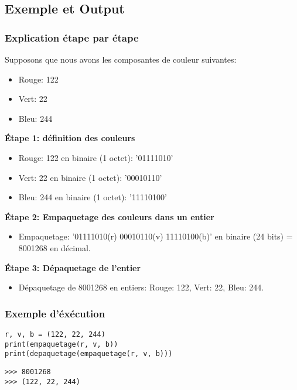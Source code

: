 \documentclass{article}
\begin{document}
\subsection*{Exemple et Output}
\subsubsection*{Explication étape par étape}
Supposons que nous avons les composantes de couleur suivantes:
\begin{itemize}
  \item Rouge: 122
  \item Vert: 22
  \item Bleu: 244
\end{itemize}

\textbf{Étape 1: définition des couleurs}
\begin{itemize}
  \item Rouge: 122 en binaire (1 octet): '01111010'
  \item Vert: 22 en binaire (1 octet): '00010110'
  \item Bleu: 244 en binaire (1 octet): '11110100'
\end{itemize}

\textbf{Étape 2: Empaquetage des couleurs dans un entier}
\begin{itemize}
  \item Empaquetage: '01111010(r) 00010110(v) 11110100(b)' en binaire (24 bits) = 8001268 en décimal.
\end{itemize}

\textbf{Étape 3: Dépaquetage de l'entier}
\begin{itemize}
  \item Dépaquetage de 8001268 en entiers: Rouge: 122, Vert: 22, Bleu: 244.
\end{itemize}

\subsubsection*{Exemple d'éxécution}
\begin{lstlisting}[caption=Exemple d'éxécution]
r, v, b = (122, 22, 244)
print(empaquetage(r, v, b))
print(depaquetage(empaquetage(r, v, b)))
\end{lstlisting}

\begin{lstlisting}[caption=Output]
>>> 8001268
>>> (122, 22, 244)
\end{lstlisting}
\end{document}
